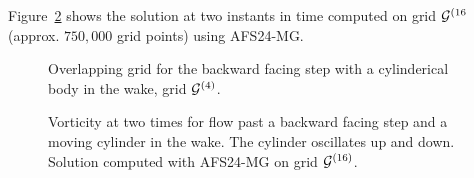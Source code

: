 \documentclass[11pt]{article}
\begin{document}
Figure~\ref{fig:backStepAndBodyMoveCylinder} shows the solution at two instants in time
computed on grid ${\mathcal G}^{(16}$ (approx. $750,000$ grid points) using AFS24-MG. 
{
\begin{figure}[hbt]
\newcommand{\figWidth}{15cm}
\newcommand{\trimfig}[2]{\trimFigb{#1}{#2}{0.0}{.25}{.27}{.275}}
\begin{center}\small
\caption{
Overlapping grid for the backward facing step with a cylinderical body in the wake, grid ${\mathcal G}^{(4)}$. 
}
\label{fig:backStepAndBodyGrids}
\end{center}
\end{figure}
}

{
\begin{figure}[hbt]
\newcommand{\figWidth}{11cm}
\newcommand{\trimfig}[2]{\trimFigb{#1}{#2}{0.0}{.0}{.27}{.3}}
\begin{center}\small
\caption{
Vorticity at two times for flow past a backward facing step and a moving cylinder in the wake. 
The cylinder oscillates up and down. 
Solution computed with AFS24-MG on grid ${\mathcal G}^{(16)}$.
}
\label{fig:backStepAndBodyMoveCylinder}
\end{center}
\end{figure}
}



\vfill\eject


\end{document}
